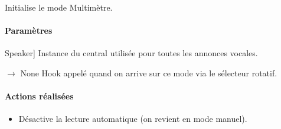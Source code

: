 \documentclass[letterpaper,10pt,french]{sphinxmanual}
\begin{document}
\begin{fulllineitems}
\begin{fulllineitems}
\label{\detokenize{api/modes:modes.mode_multimeter.ModeMultimetre.__init__}}
\pysigstartsignatures
\pysiglinewithargsret
{}
{\sphinxparamcomma {}\sphinxparamcomma {}\sphinxparamcomma {}}
{}
\pysigstopsignatures
\sphinxAtStartPar
Initialise le mode Multimètre.


\paragraph{Paramètres}
\label{\detokenize{api/modes:id5}}\begin{description}
\sphinxlineitem{speaker}{[}Speaker{]}
\sphinxAtStartPar
Instance du  central utilisée pour toutes les annonces vocales.

\end{description}

\end{fulllineitems}


\begin{fulllineitems}
\label{\detokenize{api/modes:modes.mode_multimeter.ModeMultimetre.on_enter}}
\pysigstartsignatures
\pysiglinewithargsret
{}
{}
{{ $\rightarrow$ None}}
\pysigstopsignatures
\sphinxAtStartPar
Hook appelé quand on arrive sur ce mode via le sélecteur rotatif.


\paragraph{Actions réalisées}
\label{\detokenize{api/modes:actions-realisees}}\begin{itemize}
\item {} 
\sphinxAtStartPar
Désactive la lecture automatique (on revient en mode manuel).


\end{itemize}
\end{fulllineitems}
\end{fulllineitems}
\end{document}
